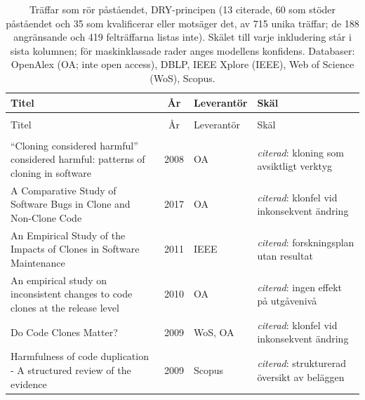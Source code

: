 
\begingroup\footnotesize
\begin{longtable}{@{}%
  >{\raggedright\arraybackslash}p{}c%
  >{\raggedright\arraybackslash}p{}%
  >{\raggedright\arraybackslash}p{}@{}}
\caption{Träffar som rör påståendet, DRY-principen (13 citerade, 60 som stöder påståendet och 35 som kvalificerar eller motsäger det, av 715 unika träffar; de 188 angränsande och 419 felträffarna listas inte). Skälet till varje inkludering står i sista kolumnen; för maskinklassade rader anges modellens konfidens. Databaser: OpenAlex (OA; inte open access), DBLP, IEEE Xplore (IEEE), Web of Science (WoS), Scopus.}\label{tab:sok-dry}\\
\toprule
Titel & År & Leverantör & Skäl \\
\midrule
\endfirsthead
\multicolumn{4}{@{}l}{\emph{\tablename~\thetable{} (\GetTranslation{continued})}}\\
\toprule
Titel & År & Leverantör & Skäl \\
\midrule
\endhead
\midrule \multicolumn{4}{r@{}}{\emph{\GetTranslation{continued on the next page}}}\\
\endfoot
\bottomrule
\endlastfoot
``Cloning considered harmful'' considered harmful: patterns of cloning in software & 2008 & OA & \emph{citerad}: kloning som avsiktligt verktyg \\
A Comparative Study of Software Bugs in Clone and Non-Clone Code & 2017 & OA & \emph{citerad}: klonfel vid inkonsekvent ändring \\
An Empirical Study of the Impacts of Clones in Software Maintenance & 2011 & IEEE & \emph{citerad}: forskningsplan utan resultat \\
An empirical study on inconsistent changes to code clones at the release level & 2010 & OA & \emph{citerad}: ingen effekt på utgåvenivå \\
Do Code Clones Matter? & 2009 & WoS, OA & \emph{citerad}: klonfel vid inkonsekvent ändring \\
Harmfulness of code duplication - A structured review of the evidence & 2009 & Scopus & \emph{citerad}: strukturerad översikt av beläggen \\

\end{longtable}
